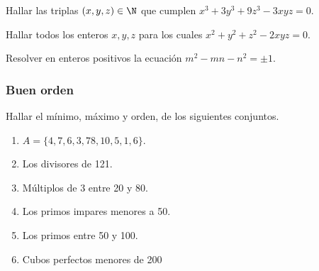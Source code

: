 \begin{problem}
    Hallar las triplas $(x,y,z) \in \N$ que cumplen $x^3 + 3y^3 + 9z^3 - 3xyz = 0$.
\end{problem}

\begin{problem}
    Hallar todos los enteros $x,y,z$ para los cuales $x^2 + y^2 + z^2 - 2xyz = 0$.
\end{problem}

\begin{problem}
    Resolver en enteros positivos la ecuación $m^2 - mn - n^2 = \pm 1.$
\end{problem}



\subsubsection{Buen orden}
\begin{exercise}
    Hallar el mínimo, máximo y orden, de los siguientes conjuntos.
    \begin{multicols}{2}
        \begin{enumerate}
            \item $A = \{4,7,6,3,78,10,5, 1,6\}$.
            \item Los divisores de 121.
            \item Múltiplos de 3 entre 20 y 80.
            \item Los primos impares menores a 50.
            \item Los primos entre 50 y 100.
            \item Cubos perfectos menores de 200
        \end{enumerate}
    \end{multicols}
\end{exercise}